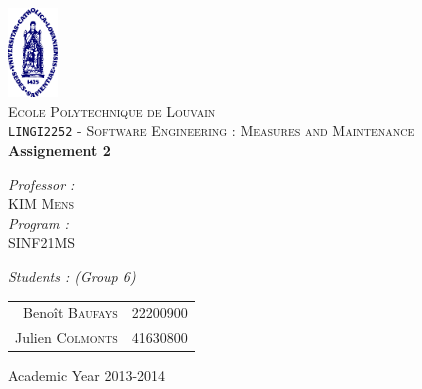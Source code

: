 \begin{titlepage}
 
\begin{center}
 
\vspace*{-2cm}\includegraphics[width=0.10\textwidth]{ucl.png}\\[1cm]
 
\textsc{\LARGE Ecole Polytechnique de Louvain}\\[1.5cm]
 
\textsc{\Large \texttt{LINGI2252} - Software Engineering : Measures and Maintenance }\\[0.5cm]
 
 
\vspace{1.0cm}
{ \huge \bfseries Assignement 2\vspace{0.8cm}\\}
 
\vspace{1.0cm}
 
\begin{minipage}{0.4\textwidth}
\begin{flushleft} \large
\emph{Professor :}\\
	KIM \textsc{Mens}\\
\vspace{1cm}
\emph{Program :}\\
	SINF21MS
\end{flushleft}
\end{minipage}
\begin{minipage}{0.4\textwidth}
\begin{flushright} \large
\emph{Students : (Group 6)} \\
\begin{tabular}{rl}
	Benoît \textsc{Baufays}		& {\footnotesize 22200900}\\
	Julien \textsc{Colmonts}	& {\footnotesize 41630800}\\

\end{tabular}
\end{flushright}
\end{minipage}
 
\vfill
 
\vspace{1.1cm}
{\large Academic Year 2013-2014}
\vspace{-1cm} 
\end{center}
 
\end{titlepage}
